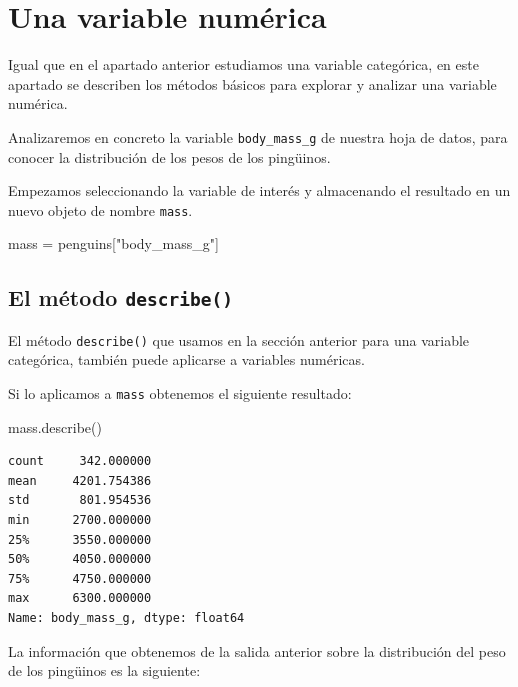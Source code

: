 \documentclass[
  a4paper,
  noprof,
  12pt,
  notoc,
  nosols,
  nobib]{mnye}
\newenvironment{Shaded}{\begin{snugshade}}{\end{snugshade}}
\newcommand{\NormalTok}[1]{\textcolor[rgb]{0.00,0.23,0.31}{#1}}
\newcommand{\OperatorTok}[1]{\textcolor[rgb]{0.37,0.37,0.37}{#1}}
\newcommand{\StringTok}[1]{\textcolor[rgb]{0.13,0.47,0.30}{#1}}
\theoremstyle{definition}
\theoremstyle{remark}
\begin{document}

\section{Una variable numérica}\label{sec-1numerical}

Igual que en el apartado anterior estudiamos una variable categórica, en
este apartado se describen los métodos básicos para explorar y analizar
una variable numérica.

Analizaremos en concreto la variable \texttt{body\_mass\_g} de nuestra
hoja de datos, para conocer la distribución de los pesos de los
pingüinos.

Empezamos seleccionando la variable de interés y almacenando el
resultado en un nuevo objeto de nombre \texttt{mass}.

\begin{Shaded}
\begin{Highlighting}[]
\NormalTok{mass }\OperatorTok{=}\NormalTok{ penguins[}\StringTok{"body\_mass\_g"}\NormalTok{]}
\end{Highlighting}
\end{Shaded}

\subsection{\texorpdfstring{El método
\texttt{describe()}}{El método describe()}}\label{sec-1numerical-describe}

El método \texttt{describe()} que usamos en la sección anterior para una
variable categórica, también puede aplicarse a variables numéricas.

Si lo aplicamos a \texttt{mass} obtenemos el siguiente resultado:

\begin{Shaded}
\begin{Highlighting}[]
\NormalTok{mass.describe()}
\end{Highlighting}
\end{Shaded}

\begin{verbatim}
count     342.000000
mean     4201.754386
std       801.954536
min      2700.000000
25%      3550.000000
50%      4050.000000
75%      4750.000000
max      6300.000000
Name: body_mass_g, dtype: float64
\end{verbatim}

La información que obtenemos de la salida anterior sobre la distribución
del peso de los pingüinos es la siguiente:
\end{document}
